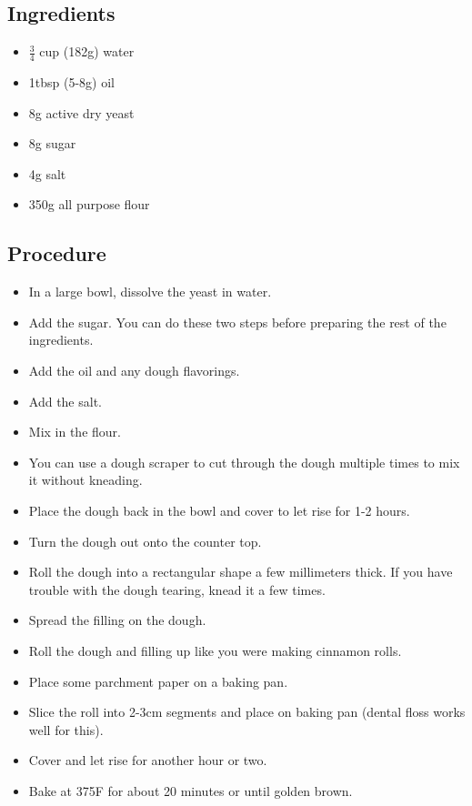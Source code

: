 \documentclass[10pt, openany]{book}
\begin{document}
\subsection{Ingredients}
\begin{itemize}
  \item $\frac{3}{4}$ cup (182g) water
  \item 1tbsp (5-8g) oil
  \item 8g active dry yeast
  \item 8g sugar
  \item 4g salt
  \item 350g all purpose flour
\end{itemize}

\subsection{Procedure}
\begin{itemize}
  \item In a large bowl, dissolve the yeast in water.
  \item Add the sugar.  You can do these two steps before preparing the rest of the ingredients.
  \item Add the oil and any dough flavorings.
  \item Add the salt.
  \item Mix in the flour.
  \item You can use a dough scraper to cut through the dough multiple times to mix it without kneading.
  \item Place the dough back in the bowl and cover to let rise for 1-2 hours.
  \item Turn the dough out onto the counter top.
  \item Roll the dough into a rectangular shape a few millimeters thick.  If you have trouble with the dough tearing, knead it a few times.
  \item Spread the filling on the dough.
  \item Roll the dough and filling up like you were making cinnamon rolls.
  \item Place some parchment paper on a baking pan.
  \item Slice the roll into 2-3cm segments and place on baking pan (dental floss works well for this).
  \item Cover and let rise for another hour or two.
  \item Bake at 375\degree{}F for about 20 minutes or until golden brown.
\end{itemize}
\end{document}
